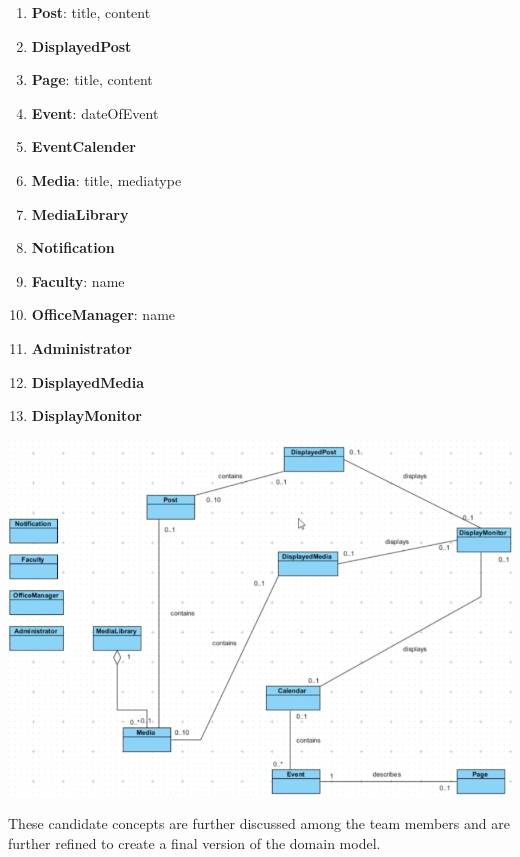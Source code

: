 \documentclass{article}
\begin{document}
\begin{minipage}{0.3\textwidth}
    \begin{enumerate}
        \item \textbf{Post}: title, content
        \item \textbf{DisplayedPost}
        \item \textbf{Page}: title, content
        \item \textbf{Event}: dateOfEvent
        \item \textbf{EventCalender}
        \item \textbf{Media}: title, mediatype
        \item \textbf{MediaLibrary}
        \item \textbf{Notification}
        \item \textbf{Faculty}: name
        \item \textbf{OfficeManager}: name
        \item \textbf{Administrator}
        \item \textbf{DisplayedMedia}
        \item \textbf{DisplayMonitor}
    \end{enumerate}
\end{minipage}%
\begin{minipage}{0.7\textwidth}
    \includegraphics[scale=0.52]{images/draft-Concepts.png}
\end{minipage}

These candidate concepts are further discussed among the team members and are further refined to create a final version of the domain model.
\end{document}
